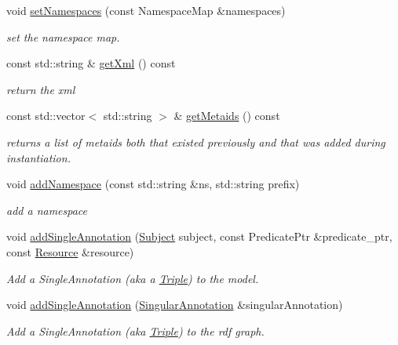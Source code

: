 \begin{DoxyCompactItemize}
\mbox{\label{classomexmeta_1_1Editor_a83836e19bb1de9c7df69d36e8b61b2b2}} 
void \hyperlink{classomexmeta_1_1Editor_a83836e19bb1de9c7df69d36e8b61b2b2}{set\+Namespaces} (const Namespace\+Map \&namespaces)
\begin{DoxyCompactList}\small\item\em set the namespace map. \end{DoxyCompactList}\item 
const std\+::string \& \hyperlink{classomexmeta_1_1Editor_ad931e829fc9f78717e0c1443c619b7d3}{get\+Xml} () const
\begin{DoxyCompactList}\small\item\em return the xml \end{DoxyCompactList}\item 
const std\+::vector$<$ std\+::string $>$ \& \hyperlink{classomexmeta_1_1Editor_a242c86222e1aeff337d3af22641db1de}{get\+Metaids} () const
\begin{DoxyCompactList}\small\item\em returns a list of metaids both that existed previously and that was added during instantiation. \end{DoxyCompactList}\item 
void \hyperlink{classomexmeta_1_1Editor_a052a725cee8b8e577c55e977eee81ace}{add\+Namespace} (const std\+::string \&ns, std\+::string prefix)
\begin{DoxyCompactList}\small\item\em add a namespace \end{DoxyCompactList}\item 
void \hyperlink{classomexmeta_1_1Editor_a0417b55575a244817ef981f17c8e1a8f}{add\+Single\+Annotation} (\hyperlink{classomexmeta_1_1Subject}{Subject} subject, const Predicate\+Ptr \&predicate\+\_\+ptr, const \hyperlink{classomexmeta_1_1Resource}{Resource} \&resource)
\begin{DoxyCompactList}\small\item\em Add a Single\+Annotation (aka a \hyperlink{classomexmeta_1_1Triple}{Triple}) to the model. \end{DoxyCompactList}\item 
void \hyperlink{classomexmeta_1_1Editor_ae46835f3f35425d8087b80d08666aaa4}{add\+Single\+Annotation} (\hyperlink{classomexmeta_1_1Triple}{Singular\+Annotation} \&singular\+Annotation)
\begin{DoxyCompactList}\small\item\em Add a Single\+Annotation (aka \hyperlink{classomexmeta_1_1Triple}{Triple}) to the rdf graph. \end{DoxyCompactList}\item 

\end{DoxyCompactItemize}
